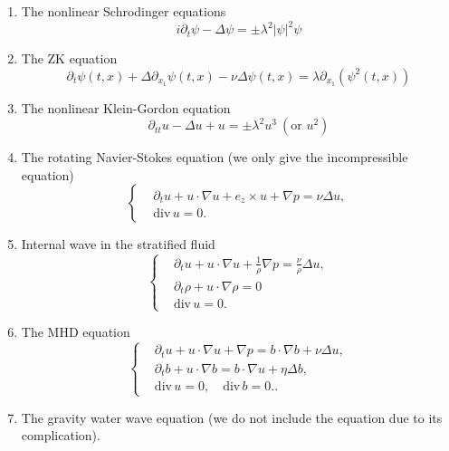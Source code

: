 \begin{enumerate}
    \item The nonlinear Schrodinger equations
    \begin{equation}\label{eq.NLS}
        i\partial_t\psi-\Delta\psi=\pm\lambda^2 |\psi|^2\psi
    \end{equation}
    \item The ZK equation
    \begin{equation}\label{eq.ZK}
        \partial_t\psi(t,x)+\Delta\partial_{x_1}\psi(t,x)-\nu \Delta \psi(t,x)=\lambda \partial_{x_1}(\psi^2(t,x))
    \end{equation}
    \item The nonlinear Klein-Gordon equation
    \begin{equation}\label{eq.KG}
        \partial_{tt}u-\Delta u + u=\pm\lambda^2 u^3 \ (\text{or } u^2)
    \end{equation}
    \item The rotating Navier-Stokes equation (we only give the incompressible equation)
    \begin{equation}\label{eq.rNS}
        \left\{
        \begin{aligned}
            &\partial_t u + u\cdot \nabla u + e_z\times u + \nabla p = \nu \Delta u,
            \\
            & \text{div}\, u = 0.
        \end{aligned}\right.
    \end{equation}
    \item Internal wave in the stratified fluid
    \begin{equation}\label{eq.SF}
        \left\{
        \begin{aligned}
            &\partial_t u + u\cdot \nabla u + \frac{1}{\rho}\nabla p = \frac{\nu}{\rho} \Delta u,
            \\
            & \partial_t\rho +u\cdot\nabla\rho = 0
            \\
            & \text{div}\, u = 0.
        \end{aligned}\right.
    \end{equation}
    \item The MHD equation
    \begin{equation}\label{eq.MHD}
        \left\{
        \begin{aligned}
            &\partial_t u + u\cdot \nabla u + \nabla p = b\cdot\nabla b + \nu \Delta u,
            \\
            & \partial_t b + u\cdot \nabla b  = b\cdot\nabla u + \eta \Delta b,
            \\
            & \text{div}\, u = 0,\quad \text{div}\, b = 0..
        \end{aligned}\right.
    \end{equation}
    \item The gravity water wave equation (we do not include the equation due to its complication). 
\end{enumerate}

